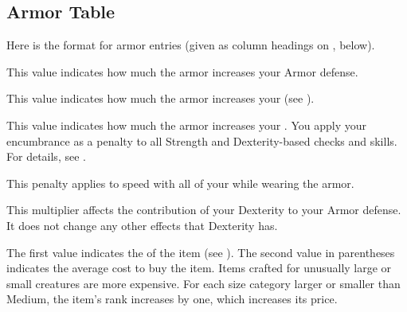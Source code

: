     \subsection{Armor Table}
        \par Here is the format for armor entries (given as column headings on , below).

         This value indicates how much the armor increases your Armor defense.

         This value indicates how much the armor increases your  (see ).

         This value indicates how much the armor increases your .
        You apply your encumbrance as a penalty to all Strength and Dexterity-based checks and skills.
        For details, see .

         This penalty applies to speed with all of your  while wearing the armor.

         This multiplier affects the contribution of your Dexterity to your Armor defense.
        It does not change any other effects that Dexterity has.

         The first value indicates the  of the item (see ).
        The second value in parentheses indicates the average cost to buy the item.
        Items crafted for unusually large or small creatures are more expensive.
        For each size category larger or smaller than Medium, the item's rank increases by one, which increases its price.

